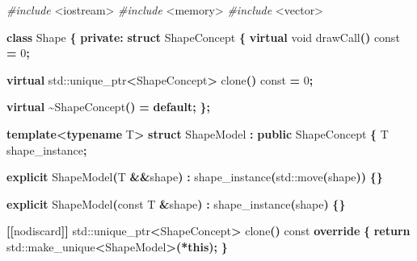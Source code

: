 \documentclass[14pt,a4paper]{article}
\newenvironment{Shaded}{\begin{paragraph}}{\end{paragraph}}
\newenvironment{Highlighting}{\begin{paragraph}}{\end{paragraph}}
\newcommand{\KeywordTok}[1]{\textcolor[rgb]{0.13,0.29,0.53}{\textbf{#1}}}
\newcommand{\DataTypeTok}[1]{\textcolor[rgb]{0.13,0.29,0.53}{#1}}
\newcommand{\DecValTok}[1]{\textcolor[rgb]{0.00,0.00,0.81}{#1}}
\newcommand{\ImportTok}[1]{#1}
\newcommand{\ControlFlowTok}[1]{\textcolor[rgb]{0.13,0.29,0.53}{\textbf{#1}}}
\newcommand{\OperatorTok}[1]{\textcolor[rgb]{0.81,0.36,0.00}{\textbf{#1}}}
\newcommand{\BuiltInTok}[1]{#1}
\newcommand{\PreprocessorTok}[1]{\textcolor[rgb]{0.56,0.35,0.01}{\textit{#1}}}
\newcommand{\AttributeTok}[1]{\textcolor[rgb]{0.77,0.63,0.00}{#1}}
\newcommand{\NormalTok}[1]{#1}
\begin{document}
\begin{Shaded}
\begin{Highlighting}[]
\PreprocessorTok{\#include }\ImportTok{\textless{}iostream\textgreater{}}
\PreprocessorTok{\#include }\ImportTok{\textless{}memory\textgreater{}}
\PreprocessorTok{\#include }\ImportTok{\textless{}vector\textgreater{}}

\KeywordTok{class}\NormalTok{ Shape }\OperatorTok{\{}
\KeywordTok{private}\OperatorTok{:}
    \KeywordTok{struct}\NormalTok{ ShapeConcept }\OperatorTok{\{}
        \KeywordTok{virtual} \DataTypeTok{void}\NormalTok{ drawCall}\OperatorTok{()} \AttributeTok{const} \OperatorTok{=} \DecValTok{0}\OperatorTok{;}

        \KeywordTok{virtual} \BuiltInTok{std::}\NormalTok{unique\_ptr}\OperatorTok{\textless{}}\NormalTok{ShapeConcept}\OperatorTok{\textgreater{}}\NormalTok{ clone}\OperatorTok{()} \AttributeTok{const} \OperatorTok{=} \DecValTok{0}\OperatorTok{;}

        \KeywordTok{virtual} \OperatorTok{\textasciitilde{}}\NormalTok{ShapeConcept}\OperatorTok{()} \OperatorTok{=} \ControlFlowTok{default}\OperatorTok{;}
    \OperatorTok{\};}

    \KeywordTok{template}\OperatorTok{\textless{}}\KeywordTok{typename}\NormalTok{ T}\OperatorTok{\textgreater{}}
    \KeywordTok{struct}\NormalTok{ ShapeModel }\OperatorTok{:} \KeywordTok{public}\NormalTok{ ShapeConcept }\OperatorTok{\{}
\NormalTok{        T shape\_instance}\OperatorTok{;}

        \KeywordTok{explicit}\NormalTok{ ShapeModel}\OperatorTok{(}\NormalTok{T }\OperatorTok{\&\&}\NormalTok{shape}\OperatorTok{)} \OperatorTok{:}\NormalTok{ shape\_instance}\OperatorTok{(}\BuiltInTok{std::}\NormalTok{move}\OperatorTok{(}\NormalTok{shape}\OperatorTok{))} \OperatorTok{\{\}}

        \KeywordTok{explicit}\NormalTok{ ShapeModel}\OperatorTok{(}\AttributeTok{const}\NormalTok{ T }\OperatorTok{\&}\NormalTok{shape}\OperatorTok{)} \OperatorTok{:}\NormalTok{ shape\_instance}\OperatorTok{(}\NormalTok{shape}\OperatorTok{)} \OperatorTok{\{\}}

        \OperatorTok{[[}\AttributeTok{nodiscard}\OperatorTok{]]} \BuiltInTok{std::}\NormalTok{unique\_ptr}\OperatorTok{\textless{}}\NormalTok{ShapeConcept}\OperatorTok{\textgreater{}}\NormalTok{ clone}\OperatorTok{()} \AttributeTok{const} \KeywordTok{override} \OperatorTok{\{}
            \ControlFlowTok{return} \BuiltInTok{std::}\NormalTok{make\_unique}\OperatorTok{\textless{}}\NormalTok{ShapeModel}\OperatorTok{\textgreater{}(*}\KeywordTok{this}\OperatorTok{);}
        \OperatorTok{\}}


\end{Highlighting}
\end{Shaded}
\end{document}
